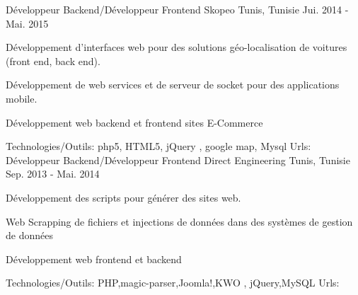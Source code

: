\begin{cventries}
{    \href{http://www.milddream.com/fr/ }{} \break
    }    
  \techentries
    {Développeur Backend/Développeur Frontend}
    {Skopeo}
    {Tunis, Tunisie}
    {Jui. 2014 - Mai. 2015}
    {
      \begin{cvitems}
        \item {Développement d'interfaces web pour des solutions géo-localisation de voitures (front end, back end).}
        \item {Développement de web services et de serveur de socket pour des applications mobile.}
        \item {Développement web backend et frontend sites E-Commerce}
      \end{cvitems}
    }
    {\textcolor{awesome}{Technologies/Outils: } {\color{graytext}}  {php5, HTML5, jQuery , google map, Mysql}}
    {Urls:} 
    {\href{http://www.taxitasso.com/}{} \break
    \href{http://carafrika.net/}{} \break
    \href{http://darafrika.com/}{} \break    
    }       
  \techentries
    {Développeur Backend/Développeur Frontend}
    {Direct Engineering}
    {Tunis, Tunisie}
    {Sep. 2013 - Mai. 2014}
    {
      \begin{cvitems}
        \item {Développement des scripts pour générer des sites web.}
        \item {Web Scrapping de fichiers et injections de données dans des systèmes de gestion de données}
        \item {Développement web frontend et backend}
      \end{cvitems}
    }
    {\textcolor{awesome}{Technologies/Outils: } {\color{graytext}}  {PHP,magic-parser,Joomla!,KWO , jQuery,MySQL}}
    {Urls:} 
    {\href{http://www.pure-jobs.com/}{} \break
    \href{http://www.jeveux1truc.fr/fr/}{} \break
    }       
\end{cventries}
